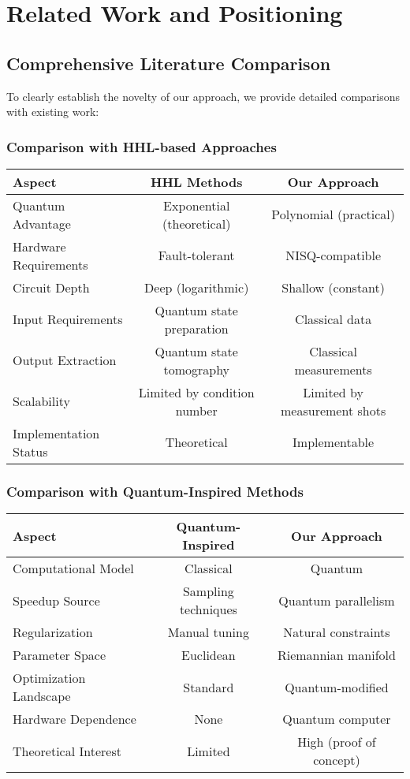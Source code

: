 \documentclass[11pt]{article}
\begin{document}
\section{Related Work and Positioning}

\subsection{Comprehensive Literature Comparison}

To clearly establish the novelty of our approach, we provide detailed comparisons with existing work:

\subsubsection{Comparison with HHL-based Approaches}

\begin{center}
\begin{tabular}{|l|c|c|}
\hline
\textbf{Aspect} & \textbf{HHL Methods} & \textbf{Our Approach} \\
\hline
Quantum Advantage & Exponential (theoretical) & Polynomial (practical) \\
Hardware Requirements & Fault-tolerant & NISQ-compatible \\
Circuit Depth & Deep (logarithmic) & Shallow (constant) \\
Input Requirements & Quantum state preparation & Classical data \\
Output Extraction & Quantum state tomography & Classical measurements \\
Scalability & Limited by condition number & Limited by measurement shots \\
Implementation Status & Theoretical & Implementable \\
\hline
\end{tabular}
\end{center}

\subsubsection{Comparison with Quantum-Inspired Methods}

\begin{center}
\begin{tabular}{|l|c|c|}
\hline
\textbf{Aspect} & \textbf{Quantum-Inspired} & \textbf{Our Approach} \\
\hline
Computational Model & Classical & Quantum \\
Speedup Source & Sampling techniques & Quantum parallelism \\
Regularization & Manual tuning & Natural constraints \\
Parameter Space & Euclidean & Riemannian manifold \\
Optimization Landscape & Standard & Quantum-modified \\
Hardware Dependence & None & Quantum computer \\
Theoretical Interest & Limited & High (proof of concept) \\
\hline
\end{tabular}
\end{center}
\end{document}
